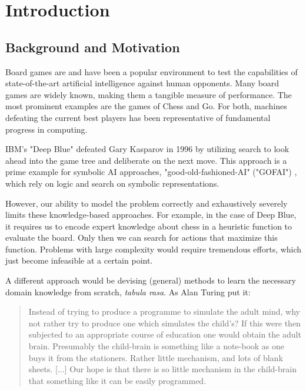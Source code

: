 \chapter{Introduction}
\label{introduction}
\section{Background and Motivation}
Board games are and have been a popular environment to test the capabilities of state-of-the-art artificial intelligence against human opponents. Many board games are widely known, making them a tangible measure of performance. The most prominent examples are the games of Chess and Go. For both, machines defeating the current best players has been representative of fundamental progress in computing.

IBM's "Deep Blue" defeated Gary Kasparov in 1996 \cite{higgins_brief_2017} by utilizing search to look ahead into the game tree and deliberate on the next move. This approach is a prime example for symbolic AI approaches, "good-old-fashioned-AI" ("GOFAI") \cite[p. 112f]{haugeland_artificial_1985}, which rely on logic and search on symbolic representations.

However, our ability to model the problem correctly and exhaustively severely limits these knowledge-based approaches. For example, in the case of Deep Blue, it requires us to encode expert knowledge about chess in a heuristic function to evaluate the board. Only then we can search for actions that maximize this function. Problems with large complexity would require tremendous efforts, which just become infeasible at a certain point.

A different approach would be devising (general) methods to learn the necessary domain knowledge from scratch,  \emph{tabula rasa}. As Alan Turing put it:

\begin{quote}
    Instead of trying to produce a programme to simulate the adult mind, why not rather try to produce one which simulates the child's? If this were then subjected to an appropriate course of education one would obtain the adult brain. Presumably the child-brain is something like a note-book as one buys it from the stationers. Rather little mechanism, and lots of blank sheets. [...] Our hope is that there is so little mechanism in the child-brain that something like it can be easily programmed.
    \cite{turing_icomputing_1950}
\end{quote}

